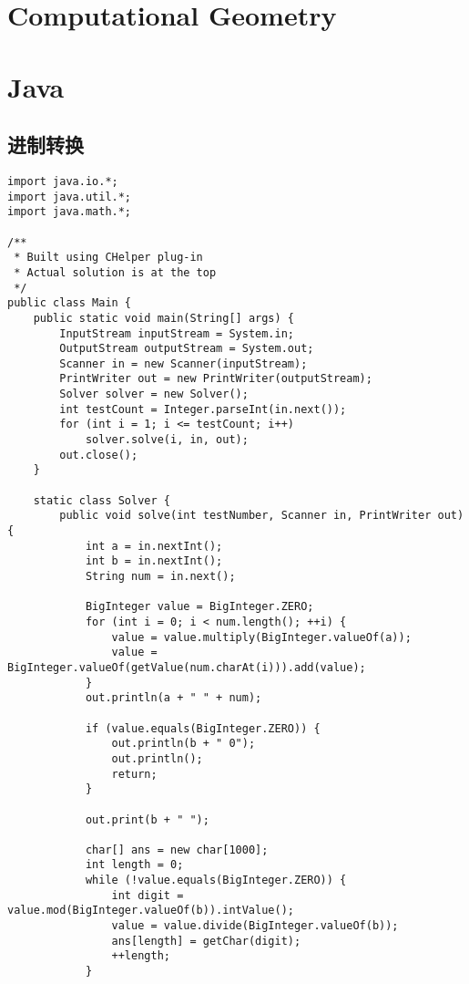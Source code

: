 \documentclass[twoside]{article}
\begin{document}
\section{Computational Geometry}


\section{Java}

\subsection{进制转换}
\begin{lstlisting}
import java.io.*;
import java.util.*;
import java.math.*;

/**
 * Built using CHelper plug-in
 * Actual solution is at the top
 */
public class Main {
    public static void main(String[] args) {
        InputStream inputStream = System.in;
        OutputStream outputStream = System.out;
        Scanner in = new Scanner(inputStream);
        PrintWriter out = new PrintWriter(outputStream);
        Solver solver = new Solver();
        int testCount = Integer.parseInt(in.next());
        for (int i = 1; i <= testCount; i++)
            solver.solve(i, in, out);
        out.close();
    }

    static class Solver {
        public void solve(int testNumber, Scanner in, PrintWriter out) {
            int a = in.nextInt();
            int b = in.nextInt();
            String num = in.next();

            BigInteger value = BigInteger.ZERO;
            for (int i = 0; i < num.length(); ++i) {
                value = value.multiply(BigInteger.valueOf(a));
                value = BigInteger.valueOf(getValue(num.charAt(i))).add(value);
            }
            out.println(a + " " + num);

            if (value.equals(BigInteger.ZERO)) {
                out.println(b + " 0");
                out.println();
                return;
            }

            out.print(b + " ");

            char[] ans = new char[1000];
            int length = 0;
            while (!value.equals(BigInteger.ZERO)) {
                int digit = value.mod(BigInteger.valueOf(b)).intValue();
                value = value.divide(BigInteger.valueOf(b));
                ans[length] = getChar(digit);
                ++length;
            }


\end{lstlisting}
\end{document}
